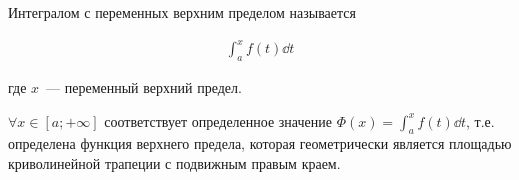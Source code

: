 
\begin{minipage}{\linewidth}
  \begin{multicols*}{2}
  \columnbreak
  \begin{definition}
    Интегралом с переменных верхним пределом называется
    
    \begin{align*}
      \int_{a}^{x} f(t) \dd t
    \end{align*}

    где \(x\)~--- переменный верхний предел.
  \end{definition}
  \end{multicols*}
\end{minipage}

\begin{remark}
  \(\forall x \in [a; +\infty]\) соответствует определенное значение
  \(\Phi(x) = \int_{a}^{x} f(t) \dd t\), т.е. определена функция верхнего
  предела, которая геометрически является площадью криволинейной трапеции
  с подвижным правым краем.
\end{remark}

